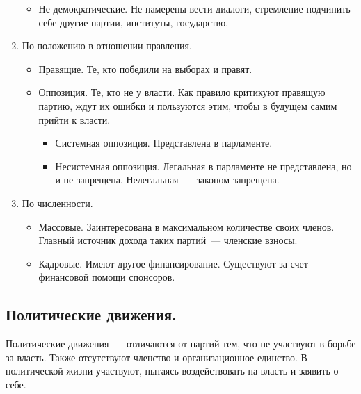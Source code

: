 \documentclass[12pt]{article}
\begin{document}
\begin{enumerate}
\begin{itemize}
			\item Не демократические. Не намерены вести диалоги, стремление подчинить себе другие партии, институты, государство.
		\end{itemize}
		\item По положению в отношении правления.
		\begin{itemize}
			\item Правящие. Те, кто победили на выборах и правят.
			\item Оппозиция. Те, кто не у власти. Как правило критикуют правящую партию, ждут их ошибки и пользуются этим, чтобы в будущем самим прийти к власти.
			\begin{itemize}
				\item Системная оппозиция. Представлена в парламенте.
				\item Несистемная оппозиция. Легальная в парламенте не представлена, но и не запрещена. Нелегальная~--- законом запрещена.
			\end{itemize}
		\end{itemize}
		\item По численности.
		\begin{itemize}
			\item Массовые. Заинтересована в максимальном количестве своих членов. Главный источник дохода таких партий~--- членские взносы.
			\item Кадровые. Имеют другое финансирование. Существуют за счет финансовой помощи спонсоров.
		\end{itemize}
	\end{enumerate}
	\subsection{Политические движения.}
	\begin{definition}
		Политические движения~--- отличаются от партий тем, что не участвуют в борьбе за власть. Также отсутствуют членство и организационное единство. В политической жизни участвуют, пытаясь воздействовать на власть и заявить о себе.
	\end{definition}
\end{document}

